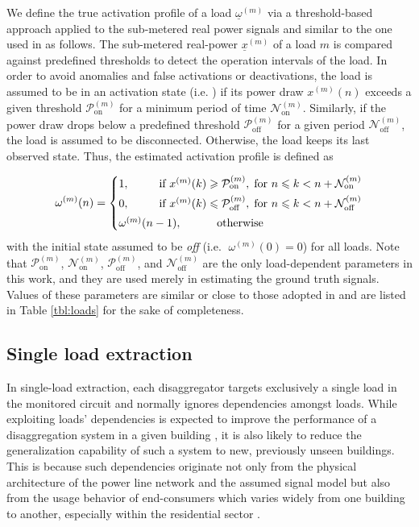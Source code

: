 \documentclass[twocolumn,letter,10pt]{IEEEtran} %
\begin{document}
We define the true activation profile of a load $\underline{\omega}^{(m)}$ via a threshold-based approach applied to the sub-metered real power signals and similar to the one used in \cite{Kelly_2015} as follows.
The sub-metered real-power $\underline{x}^{(m)}$ of a load $m$ is compared against predefined thresholds to detect the operation intervals of the load. In order to avoid anomalies and false activations or deactivations, the load is assumed to be in an activation state (i.e. \on) if its power draw $x^{(m)}(n)$ exceeds a given threshold $\mathcal{P}_{\text{on}}^{(m)}$ for a minimum period of time $\mathcal{N}_{\text{on}}^{(m)}$. Similarly, if the power draw drops below a predefined threshold $\mathcal{P}_{\text{off}}^{(m)}$ for a given period $\mathcal{N}_{\text{off}}^{(m)}$, the load is assumed to be disconnected. Otherwise, the load keeps its last observed state. Thus, the estimated activation profile is defined as

{\small\begin{equation*}
	\omega^{(m)}(n) = 
	\begin{cases}
	1, & \hspace{-10mm}\text{if } x^{(m)}(k) \geqslant \mathcal{P}_{\text{on}}^{(m)}, \; \text{for } n \leqslant k < n+\mathcal{N}_{\text{on}}^{(m)}\\[1mm]
	0, & \hspace{-10mm}\text{if } x^{(m)}(k) \leqslant \mathcal{P}_{\text{off}}^{(m)}, \; \text{for } n \leqslant k < n+\mathcal{N}_{\text{off}}^{(m)}\\[1mm]
	\omega^{(m)}(n-1),	& \hspace{8mm} \text{otherwise}
	\end{cases}
	\end{equation*}}%
with the initial state assumed to be \emph{off} (i.e. $\;\omega^{(m)}(0) = 0$) for all loads. Note that $\mathcal{P}^{(m)}_{\text{on}}$, $\mathcal{N}^{(m)}_{\text{on}}$, $\mathcal{P}^{(m)}_{\text{off}}$, and $\mathcal{N}^{(m)}_{\text{off}}$ are the only load-dependent parameters in this work, and they are used merely in estimating the ground truth signals. Values of these parameters are similar or close to those adopted in \cite{Kelly_2015} and are listed in Table \ref{tbl:loads} for the sake of completeness.

\subsection{Single load extraction}

In single-load extraction, each disaggregator targets exclusively a single load in the monitored circuit and normally ignores dependencies amongst loads. While exploiting loads' dependencies is expected to improve the performance of a disaggregation system in a given building \cite{Kim_2010, Kolter_2010_SparseCoding, Makonin_2014_PhD}, it is also likely to reduce the generalization capability of such a system to new, previously unseen buildings. This is because such dependencies originate not only from the physical architecture of the power line network and the assumed signal model but also from the usage behavior of end-consumers which varies widely from one building to another, especially within the residential sector \cite{Batra_2014_Comparison}.
\end{document}
